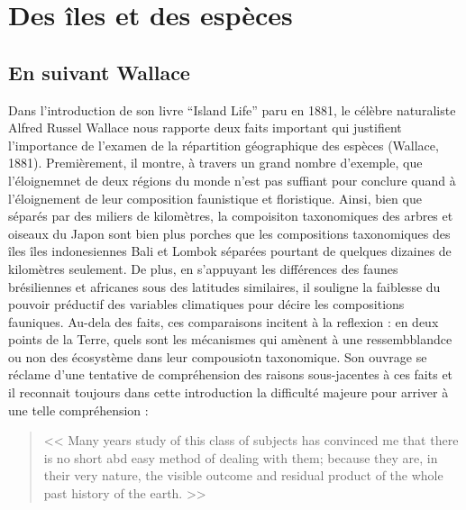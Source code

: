 \section*{Des îles et des espèces}\label{des-uxeeles-et-des-espuxe8ces}

\subsection*{En suivant Wallace}\label{en-suivant-wallace}

Dans l'introduction de son livre ``Island Life'' paru en 1881, le
célèbre naturaliste Alfred Russel Wallace nous rapporte deux faits
important qui justifient l'importance de l'examen de la répartition
géographique des espèces (Wallace, 1881). Premièrement, il montre, à
travers un grand nombre d'exemple, que l'éloignemnet de deux régions du
monde n'est pas suffiant pour conclure quand à l'éloignement de leur
composition faunistique et floristique. Ainsi, bien que séparés par des
miliers de kilomètres, la compoisiton taxonomiques des arbres et oiseaux
du Japon sont bien plus porches que les compositions taxonomiques des
îles îles indonesiennes Bali et Lombok séparées pourtant de quelques
dizaines de kilomètres seulement. De plus, en s'appuyant les différences
des faunes brésiliennes et africanes sous des latitudes similaires, il
souligne la faiblesse du pouvoir préductif des variables climatiques
pour décire les compositions fauniques. Au-dela des faits, ces
comparaisons incitent à la reflexion : en deux points de la Terre, quels
sont les mécanismes qui amènent à une ressembblandce ou non des
écosystème dans leur compousiotn taxonomique. Son ouvrage se réclame
d'une tentative de compréhension des raisons sous-jacentes à ces faits
et il reconnait toujours dans cette introduction la difficulté majeure
pour arriver à une telle compréhension :

\begin{quote}
\textless{}\textless{} Many years study of this class of subjects has
convinced me that there is no short abd easy method of dealing with
them; because they are, in their very nature, the visible outcome and
residual product of the whole past history of the earth.
\textgreater{}\textgreater{}
\end{quote}

